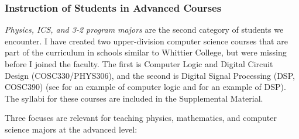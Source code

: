 \documentclass[../../../main.tex]{subfiles}
\begin{document}
\subsubsection{Instruction of Students in Advanced Courses}

\textit{Physics, ICS, and 3-2 program majors} are the second category of students we encounter.  I have created two upper-division computer science courses that are part of the curriculum in schools similar to Whittier College, but were missing before I joined the faculty.  The first is Computer Logic and Digital Circuit Design (COSC330/PHYS306), and the second is Digital Signal Processing (DSP, COSC390) (see \cite{hmc} for an example of computer logic and \cite{rio_hondo} for an example of DSP).  The syllabi for these courses are included in the Supplemental Material.
\\
\vspace{0.15cm}

Three focuses are relevant for teaching physics, mathematics, and computer science majors at the advanced level:
\end{document}
